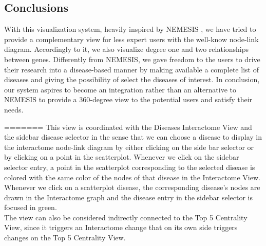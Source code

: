 \documentclass[12pt,twocolumn,twoside]{article}
\begin{document}
	\subsection*{Conclusions}
	With this visualization system, heavily inspired by NEMESIS \cite{ivapp19}, we have tried to provide a complementary view for less expert users with the well-know node-link diagram. Accordingly to it, we also visualize degree one and two relationships between genes. Differently from NEMESIS, we gave freedom to the users to drive their research into a disease-based manner by making available a complete list of diseases and giving the possibility of select the diseases of interest. In conclusion, our system aspires to become an integration rather than an alternative to NEMESIS to provide a 360-degree view to the potential users and satisfy their needs.
	\clearpage
	
	 
	
=======
This view is coordinated with the Diseases Interactome View and the sidebar disease selector in the sense that we can choose a disease to display in the interactome node-link diagram by either clicking on the side bar selector or by clicking on a point in the scatterplot. Whenever we click on the sidebar selector entry, a point in the scatterplot corresponding to the selected disease is colored with the same color of the nodes of that disease in the Interactome View. Whenever we click on a scatterplot disease, the corresponding disease's nodes are drawn in the Interactome graph and the disease entry in the sidebar selector is focused in green.\\ The view can also be considered indirectly connected to the Top 5 Centrality View, since it triggers an Interactome change that on its own side triggers changes on the Top 5 Centrality View. \\ 
\end{document}

